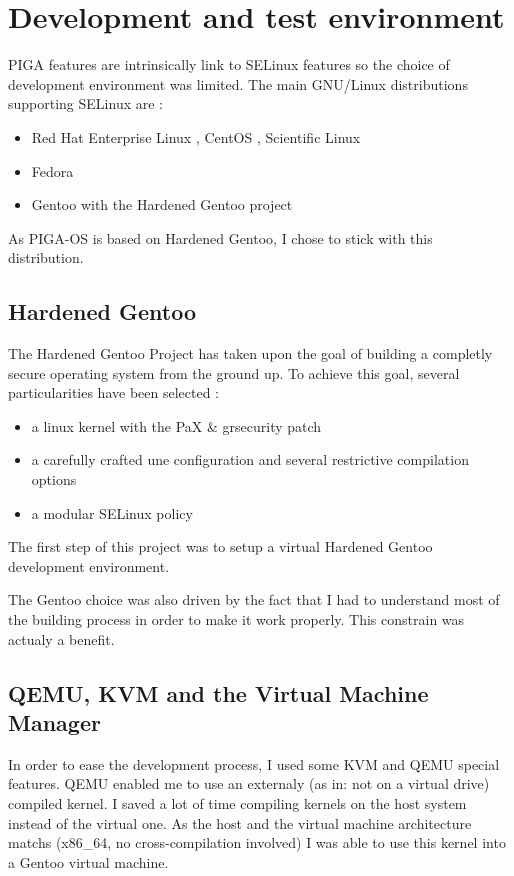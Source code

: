 \documentclass[pdftex,a4paper,titlepage,11pt]{article}
\begin{document}
\section{Development and test environment}

PIGA features are intrinsically link to SELinux features so the choice of development environment was limited. The main GNU/Linux distributions supporting SELinux are :
\begin{itemize}
	\item Red Hat Enterprise Linux \cite{RHEL}, CentOS \cite{CENTOS}, Scientific Linux \cite{SL}
	\item Fedora \cite{FEDORA}
	\item Gentoo \cite{GENTOO} with the Hardened Gentoo project \cite{GENTOOH}
\end{itemize}
As PIGA-OS is based on Hardened Gentoo, I chose to stick with this distribution.

\subsection{Hardened Gentoo}

The Hardened Gentoo Project has taken upon the goal of building a completly secure operating system from the ground up. To achieve this goal, several particularities have been selected :
\begin{itemize}
	\item a linux kernel with the PaX \& grsecurity patch
	\item a carefully crafted une configuration and several restrictive compilation options
	\item a modular SELinux policy
\end{itemize}

The first step of this project was to setup a virtual Hardened Gentoo development environment.

The Gentoo choice was also driven by the fact that I had to understand most of the building process in order to make it work properly. This constrain was actualy a benefit.

\subsection{QEMU, KVM and the Virtual Machine Manager}

In order to ease the development process, I used some KVM and QEMU special features. QEMU enabled me to use an externaly (as in: not on a virtual drive) compiled kernel. I saved a lot of time compiling kernels on the host system instead of the virtual one. As the host and the virtual machine architecture matchs (x86\_64, no cross-compilation involved) I was able to use this kernel into a Gentoo virtual machine.
\end{document}
